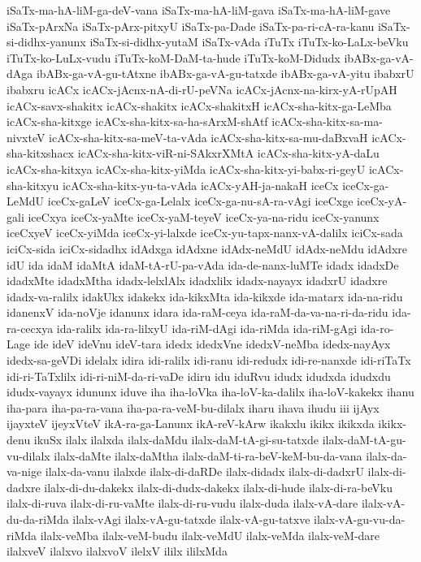 {iSaTx-ma-hA-liM-ga-deV-vana
iSaTx-ma-hA-liM-gava
iSaTx-ma-hA-liM-gave
iSaTx-pArxNa
iSaTx-pArx-pitxyU
iSaTx-pa-Dade
iSaTx-pa-ri-cA-ra-kanu
iSaTx-si-didhx-yanunx
iSaTx-si-didhx-yutaM
iSaTx-vAda
iTuTx
iTuTx-ko-LaLx-beVku
iTuTx-ko-LuLx-vudu
iTuTx-koM-DaM-ta-hude
iTuTx-koM-Didudx
ibABx-ga-vA-dAga
ibABx-ga-vA-gu-tAtxne
ibABx-ga-vA-gu-tatxde
ibABx-ga-vA-yitu
ibabxrU
ibabxru
icACx
icACx-jAcnx-nA-di-rU-peVNa
icACx-jAcnx-na-kirx-yA-rUpAH
icACx-savx-shakitx
icACx-shakitx
icACx-shakitxH
icACx-sha-kitx-ga-LeMba
icACx-sha-kitxge
icACx-sha-kitx-sa-ha-sArxM-shAtf
icACx-sha-kitx-sa-ma-nivxteV
icACx-sha-kitx-sa-meV-ta-vAda
icACx-sha-kitx-sa-mu-daBxvaH
icACx-sha-kitxshacx
icACx-sha-kitx-viR-ni-SAkxrXMtA
icACx-sha-kitx-yA-daLu
icACx-sha-kitxya
icACx-sha-kitx-yiMda
icACx-sha-kitx-yi-babx-ri-geyU
icACx-sha-kitxyu
icACx-sha-kitx-yu-ta-vAda
icACx-yAH-ja-nakaH
iceCx
iceCx-ga-LeMdU
iceCx-gaLeV
iceCx-ga-Lelalx
iceCx-ga-nu-sA-ra-vAgi
iceCxge
iceCx-yA-gali
iceCxya
iceCx-yaMte
iceCx-yaM-teyeV
iceCx-ya-na-ridu
iceCx-yanunx
iceCxyeV
iceCx-yiMda
iceCx-yi-lalxde
iceCx-yu-tapx-nanx-vA-dalilx
iciCx-sada
iciCx-sida
iciCx-sidadhx
idAdxga
idAdxne
idAdx-neMdU
idAdx-neMdu
idAdxre
idU
ida
idaM
idaMtA
idaM-tA-rU-pa-vAda
ida-de-nanx-luMTe
idadx
idadxDe
idadxMte
idadxMtha
idadx-lelxlAlx
idadxlilx
idadx-nayayx
idadxrU
idadxre
idadx-va-ralilx
idakUkx
idakekx
ida-kikxMta
ida-kikxde
ida-matarx
ida-na-ridu
idanenxV
ida-noVje
idanunx
idara
ida-raM-ceya
ida-raM-da-va-na-ri-da-ridu
ida-ra-cecxya
ida-ralilx
ida-ra-lilxyU
ida-riM-dAgi
ida-riMda
ida-riM-gAgi
ida-ro-Lage
ide
ideV
ideVnu
ideV-tara
idedx
idedxVne
idedxV-neMba
idedx-nayAyx
idedx-sa-geVDi
idelalx
idira
idi-ralilx
idi-ranu
idi-redudx
idi-re-nanxde
idi-riTaTx
idi-ri-TaTxlilx
idi-ri-niM-da-ri-vaDe
idiru
idu
iduRvu
idudx
idudxda
idudxdu
idudx-vayayx
idununx
iduve
iha
iha-loVka
iha-loV-ka-dalilx
iha-loV-kakekx
ihanu
iha-para
iha-pa-ra-vana
iha-pa-ra-veM-bu-dilalx
iharu
ihava
ihudu
iii
ijAyx
ijayxteV
ijeyxVteV
ikA-ra-ga-Lanunx
ikA-reV-kArw
ikakxlu
ikikx
ikikxda
ikikx-denu
ikuSx
ilalx
ilalxda
ilalx-daMdu
ilalx-daM-tA-gi-su-tatxde
ilalx-daM-tA-gu-vu-dilalx
ilalx-daMte
ilalx-daMtha
ilalx-daM-ti-ra-beV-keM-bu-da-vana
ilalx-da-va-nige
ilalx-da-vanu
ilalxde
ilalx-di-daRDe
ilalx-didadx
ilalx-di-dadxrU
ilalx-di-dadxre
ilalx-di-du-dakekx
ilalx-di-dudx-dakekx
ilalx-di-hude
ilalx-di-ra-beVku
ilalx-di-ruva
ilalx-di-ru-vaMte
ilalx-di-ru-vudu
ilalx-duda
ilalx-vA-dare
ilalx-vA-du-da-riMda
ilalx-vAgi
ilalx-vA-gu-tatxde
ilalx-vA-gu-tatxve
ilalx-vA-gu-vu-da-riMda
ilalx-veMba
ilalx-veM-budu
ilalx-veMdU
ilalx-veMda
ilalx-veM-dare
ilalxveV
ilalxvo
ilalxvoV
ilelxV
ililx
ililxMda
}
